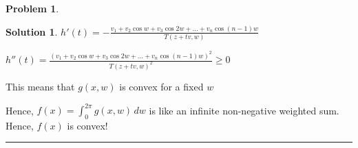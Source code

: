 \documentclass{article}
\theoremstyle{definition}
\newtheorem{problem}{Problem}
\def\fline{\rule{0.75\linewidth}{0.5pt}}
\newcommand{\finishline}{\begin{center}\fline\end{center}}
\newtheorem*{solution*}{Solution}
\newenvironment{solution}{\begin{solution*}}{{\finishline} \end{solution*}}
\begin{document}
\begin{problem}
\begin{itemize}
\begin{solution}
    $h'(t) = - \frac{v_1 + v_2 \cos{w} + v_3 \cos{2w} + \dots + v_n \cos{(n - 1)w} }{T(z + tv, w)}$ \newline 

    $h''(t) = \frac{(v_1 + v_2 \cos{w} + v_3 \cos{2w} + \dots + v_n \cos{(n - 1)w} )^2}{T(z + tv, w)^2} \geq 0$

    This means that $g(x, w)$ is convex for a fixed $w$ \newline 

    Hence, $f(x) = \int_{0}^{2\pi} g(x, w) \,dw$ is like an infinite non-negative weighted sum. Hence, $f(x)$ is convex!
    

\end{solution}
    \end{itemize}
\end{problem}
\end{document}
